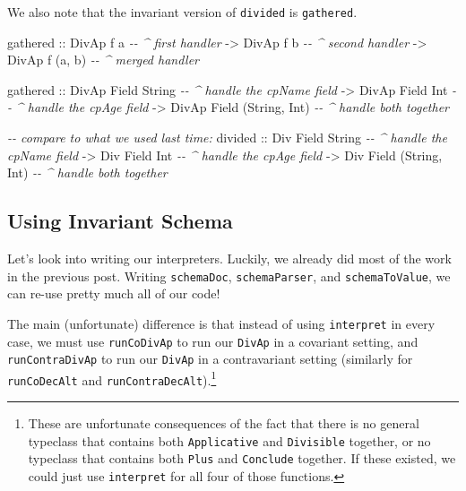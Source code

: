 \documentclass[]{article}
\newenvironment{Shaded}{}{}
\newcommand{\CommentTok}[1]{\textcolor[rgb]{0.38,0.63,0.69}{\textit{#1}}}
\newcommand{\DataTypeTok}[1]{\textcolor[rgb]{0.56,0.13,0.00}{#1}}
\newcommand{\NormalTok}[1]{#1}
\newcommand{\OtherTok}[1]{\textcolor[rgb]{0.00,0.44,0.13}{#1}}
\begin{document}
We also note that the invariant version of \texttt{divided} is
\texttt{gathered}.

\begin{Shaded}
\begin{Highlighting}[]
\NormalTok{gathered}
\OtherTok{    ::} \DataTypeTok{DivAp}\NormalTok{ f a          }\CommentTok{{-}{-} \^{} first handler}
    \OtherTok{{-}\textgreater{}} \DataTypeTok{DivAp}\NormalTok{ f b          }\CommentTok{{-}{-} \^{} second handler}
    \OtherTok{{-}\textgreater{}} \DataTypeTok{DivAp}\NormalTok{ f (a, b)     }\CommentTok{{-}{-} \^{} merged handler}

\NormalTok{gathered}
\OtherTok{    ::} \DataTypeTok{DivAp} \DataTypeTok{Field} \DataTypeTok{String}          \CommentTok{{-}{-} \^{} handle the cpName field}
    \OtherTok{{-}\textgreater{}} \DataTypeTok{DivAp} \DataTypeTok{Field} \DataTypeTok{Int}             \CommentTok{{-}{-} \^{} handle the cpAge field}
    \OtherTok{{-}\textgreater{}} \DataTypeTok{DivAp} \DataTypeTok{Field}\NormalTok{ (}\DataTypeTok{String}\NormalTok{, }\DataTypeTok{Int}\NormalTok{)   }\CommentTok{{-}{-} \^{} handle both together}

\CommentTok{{-}{-} compare to what we used last time:}
\NormalTok{divided}
\OtherTok{    ::} \DataTypeTok{Div} \DataTypeTok{Field} \DataTypeTok{String}          \CommentTok{{-}{-} \^{} handle the cpName field}
    \OtherTok{{-}\textgreater{}} \DataTypeTok{Div} \DataTypeTok{Field} \DataTypeTok{Int}             \CommentTok{{-}{-} \^{} handle the cpAge field}
    \OtherTok{{-}\textgreater{}} \DataTypeTok{Div} \DataTypeTok{Field}\NormalTok{ (}\DataTypeTok{String}\NormalTok{, }\DataTypeTok{Int}\NormalTok{)   }\CommentTok{{-}{-} \^{} handle both together}
\end{Highlighting}
\end{Shaded}

\subsection{Using Invariant Schema}\label{using-invariant-schema}

Let's look into writing our interpreters. Luckily, we already did most of the
work in the previous post. Writing \texttt{schemaDoc}, \texttt{schemaParser},
and \texttt{schemaToValue}, we can re-use pretty much all of our code!

The main (unfortunate) difference is that instead of using \texttt{interpret} in
every case, we must use \texttt{runCoDivAp} to run our \texttt{DivAp} in a
covariant setting, and \texttt{runContraDivAp} to run our \texttt{DivAp} in a
contravariant setting (similarly for \texttt{runCoDecAlt} and
\texttt{runContraDecAlt}).\footnote{These are unfortunate consequences of the
  fact that there is no general typeclass that contains both
  \texttt{Applicative} and \texttt{Divisible} together, or no typeclass that
  contains both \texttt{Plus} and \texttt{Conclude} together. If these existed,
  we could just use \texttt{interpret} for all four of those functions.}
\end{document}
